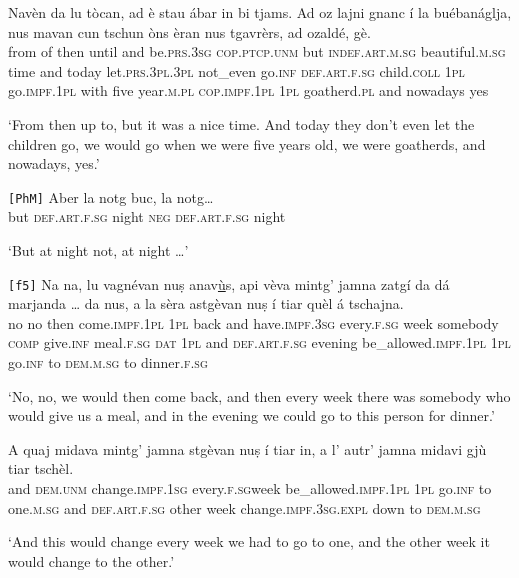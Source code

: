 \begin{linenumbers}
\gll    Navèn da lu tòcan, ad è stau ábar in bi tjams. Ad oz lajni gnanc í la buébanáglja, nus mavan cun tschun òns èran nus tgavrèrs, ad ozaldé, gè.\\
from of then until and  be.\textsc{prs.3sg} \textsc{cop.ptcp.unm} but \textsc{indef.art.m.sg} beautiful.\textsc{m.sg} time and today let.\textsc{prs.3pl.3pl} not\_even go.\textsc{inf} \textsc{def.art.f.sg} child.\textsc{coll} \textsc{1pl} go.\textsc{impf.1pl} with five year.\textsc{m.pl}  \textsc{cop.impf.1pl} \textsc{1pl} goatherd.\textsc{pl} and nowadays yes\\
\end{linenumbers}
\medskip
\glt `From then up to, but it was a nice time. And today they don’t even let the children go, we would go when we were five years old, we were goatherds, and nowadays, yes.'
\medskip

\begin{linenumbers}
\gll  \texttt{[PhM]} Aber la notg buc, la notg…\\
\textsc{} but \textsc{def.art.f.sg} night  \textsc{neg} \textsc{def.art.f.sg} night  \\
\end{linenumbers}
\medskip
\glt `But at night not, at night …'
\medskip

\begin{linenumbers}
\gll \texttt{[f5]} Na na, lu vagnévan nuṣ anav\underline{ù}s, api vèva mintg’ jamna zatgí da dá marjanda … da nus, a la sèra astgèvan nuṣ í tiar quèl á tschajna.\\
{} no no then come.\textsc{impf.1pl} \textsc{1pl} back and have.\textsc{impf.3sg} every.\textsc{f.sg}  week somebody \textsc{comp} give.\textsc{inf} meal.\textsc{f.sg} {} \textsc{dat} \textsc{1pl} and \textsc{def.art.f.sg} evening be\_allowed.\textsc{impf.1pl} \textsc{1pl} go.\textsc{inf} to \textsc{dem.m.sg} to dinner.\textsc{f.sg}\\
\end{linenumbers}
\medskip
\glt `No, no, we would then come back, and then every week there was somebody who would give us a meal, and in the evening we could go to this person for dinner.'
\medskip

\begin{linenumbers}
\gll    A quaj midava mintg’ jamna stgèvan nuṣ í tiar in, a l’ autr’ jamna midavi gjù tiar tschèl. \\
and \textsc{dem.unm} change.\textsc{impf.1sg} every.\textsc{f.sg}week be\_allowed.\textsc{impf.1pl}  \textsc{1pl} go.\textsc{inf} to one.\textsc{m.sg} and \textsc{def.art.f.sg} other week   change.\textsc{impf.3sg.expl} down to \textsc{dem.m.sg} \\
\end{linenumbers}
\medskip
\glt `And this would change every week we had to go to one, and the other week it would change to the other.'
\medskip

